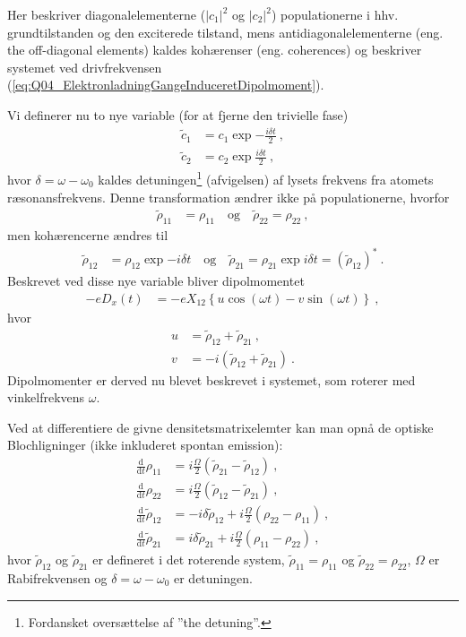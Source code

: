 Her beskriver diagonalelementerne ($|c_1|^2$ og $|c_2|^2$) populationerne i hhv. grundtilstanden og den exciterede tilstand, mens antidiagonalelementerne (eng. the off-diagonal elements) kaldes \textsf{kohærenser} (eng. coherences) og beskriver systemet ved drivfrekvensen (\cref{eq:Q04_ElektronladningGangeInduceretDipolmoment}).

Vi definerer nu to nye variable (for at fjerne den trivielle fase)
\begin{align}
    \widetilde{c}_1 &= c_1\exp{-\frac{i\delta t}{2}} \: , \\
    \widetilde{c}_2 &= c_2\exp{\frac{i\delta t}{2}} \: ,
\end{align}
hvor $\delta = \omega - \omega_0$ kaldes \textsf{detuningen}\footnote{Fordansket oversættelse af ''the detuning''.} (afvigelsen) af lysets frekvens fra atomets ræsonansfrekvens. Denne transformation ændrer ikke på populationerne, hvorfor
\begin{align}
    \widetilde{\rho}_{11} &= \rho_{11} \quad \text{og} \quad \widetilde{\rho}_22 = \rho_{22} \: ,
\end{align}
men kohærencerne ændres til
\begin{align}
    \widetilde{\rho}_{12} &= \rho_{12}\exp{-i\delta t} \quad \text{og} \quad \widetilde{\rho}_{21} = \rho_{21}\exp{i\delta t} = (\widetilde{\rho}_{12})^* \: .
\end{align}
Beskrevet ved disse nye variable bliver dipolmomentet
\begin{align}
    -eD_x(t) &= -eX_{12}\left\{u\cos(\omega t) - v\sin(\omega t)\right\} \: ,
\end{align}
hvor
\begin{align}
    u &= \widetilde{\rho}_{12} + \widetilde{\rho}_{21} \: , \\
    v &= -i\left(\widetilde{\rho}_{12} + \widetilde{\rho}_{21}\right) \: .
\end{align}
Dipolmomenter er derved nu blevet beskrevet i systemet, som roterer med vinkelfrekvens $\omega$.

Ved at differentiere de givne densitetsmatrixelemter kan man opnå de optiske Blochligninger (ikke inkluderet spontan emission):
\begin{align} \label{eq:Q04_OpticalBlochEquations}
    \frac{\text{d}}{\text{d}t}\rho_{11} &= i \frac{\Omega}{2}\left(\widetilde{\rho}_{21} - \widetilde{\rho}_{12}\right) \: , \\
    \frac{\text{d}}{\text{d}t}\rho_{22} &= i \frac{\Omega}{2}\left(\widetilde{\rho}_{12} - \widetilde{\rho}_{21}\right) \: , \\
    \frac{\text{d}}{\text{d}t}\widetilde{\rho}_{12} &= -i\delta\widetilde{\rho}_{12} + i \frac{\Omega}{2}\left(\rho_{22} - \rho_{11}\right) \: , \\
    \frac{\text{d}}{\text{d}t}\widetilde{\rho}_{21} &= i\delta\widetilde{\rho}_{21} + i \frac{\Omega}{2}\left(\rho_{11} - \rho_{22}\right) \: ,
\end{align}
hvor $\widetilde{\rho}_{12}$ og $\widetilde{\rho}_{21}$ er defineret i det roterende system, $\widetilde{\rho}_{11} = \rho_{11}$ og $\widetilde{\rho}_{22} = \rho_{22}$, $\Omega$ er Rabifrekvensen og $\delta = \omega - \omega_0$ er detuningen.

